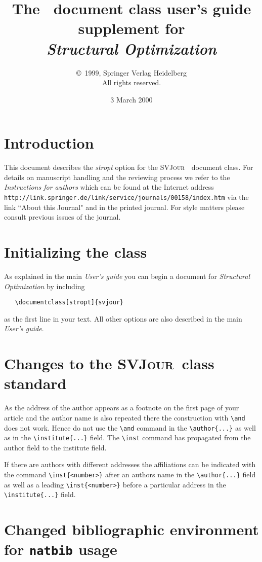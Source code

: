 \documentclass[draft]{ltxguide}[1995/11/28]
\title{The \SJour\ document class user's guide\\supplement for\\
\textit{Structural Optimization}}
\author{\copyright~1999, Springer Verlag Heidelberg\\
   All rights reserved.}
\date{3 March 2000}
\newcommand{\SJour}{\textsc{SVJour}}
\begin{document}
\maketitle

\section{Introduction}
\label{sec:intro}
This document describes the \textit{stropt} option for the \SJour\
\LaTeXe\ document class. For details on manuscript handling and the
reviewing process we refer to the \emph{Instructions for authors} which
can be found at the Internet address
 \texttt{http://link.springer.de/link/service/journals/00158/index.htm}
via the link ``About this Journal" and in the printed journal. For style
matters please consult previous issues of the journal.

\section{Initializing the class}
\label{sec:opt}

As explained in the main \emph{User's guide} you can
begin a document for \emph{Structural Optimization} by including
\begin{verbatim}
   \documentclass[stropt]{svjour}
\end{verbatim}
as the first line in your text. All other options are also described in
the main \emph{User's guide}.

\section{Changes to the \SJour\ class standard}

As the address of the author appears as a footnote on the first page
of your article and the author name is also repeated there the
construction with \verb|\and| does not work. Hence do not use the
\verb|\and| command in the \verb|\author{...}| as well as in the
\verb|\institute{...}| field. The \verb|\inst| command has
propagated from the author field to the institute field.

If there are authors with different addresses the affiliations
can be indicated with the command \verb|\inst{<number>}| after an
authors name in the \verb|\author{...}| field as well as a leading
\verb|\inst{<number>}| before a particular address in the
\verb|\institute{...}| field.

\section{Changed bibliographic environment\\
for {\tt natbib} usage}
\end{document}
